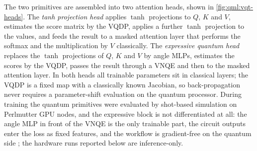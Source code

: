 The two primitives are assembled into two attention heads, shown in \cref{fig:qml:vqt-heads}. The \emph{tanh projection head} applies $\tanh$ projections to $Q$, $K$ and $V$, estimates the score matrix by the VQDP, applies a further $\tanh$ projection to the values, and feeds the result to a masked attention layer that performs the softmax and the multiplication by $V$ classically. The \emph{expressive quantum head} replaces the $\tanh$ projections of $Q$, $K$ and $V$ by angle MLPs, estimates the scores by the VQDP, passes the result through a VNQE and then to the masked attention layer. In both heads all trainable parameters sit in classical layers; the VQDP is a fixed map with a classically known Jacobian, so back-propagation never requires a parameter-shift evaluation on the quantum processor. During training the quantum primitives were evaluated by shot-based simulation on Perlmutter GPU nodes, and the expressive block is not differentiated at all: the angle MLP in front of the VNQE is the only trainable part, the circuit outputs enter the loss as fixed features, and the workflow is gradient-free on the quantum side \cite{guo2025vqt}; the hardware runs reported below are inference-only.

